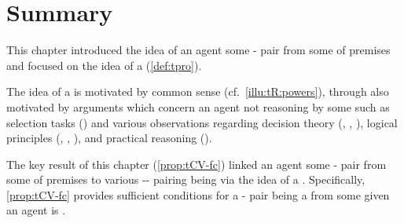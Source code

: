 \section*{Summary}

\begin{note}
  This chapter introduced the idea of an agent \tCV{} some - pair from some \pool{} of premises and focused on the idea of a \tprof{} (\autoref{def:tpro}).

  The idea of a \tpro{} is motivated by common sense (cf.\ \autoref{illu:tR:powers}), through also motivated by arguments which concern an agent not reasoning by some \torN{} such as selection tasks (\cite{Wason:1966aa}) and various observations regarding decision theory (\cite{Allais:1979aa}, \cite{Ellsberg:1961aa}, \cite{Quinn:1990aa}), logical principles (\cite{Makinson:1965aa}, \cite{Kyburg:1997aa}, \cite{Harman:1984aa}), and practical reasoning (\cite{Bratman:1981aa,Bratman:1987aa}).
\end{note}


\begin{note}
  The key result of this chapter (\autoref{prop:tCV-fc}) linked an agent \tCV{} some - pair from some \pool{} of premises to various -- pairing being  via the idea of a \tpro{}.
  Specifically, \autoref{prop:tCV-fc} provides sufficient conditions for a - pair being a \fc{} from some \pool{} given an agent is \tCV{}.
\end{note}







